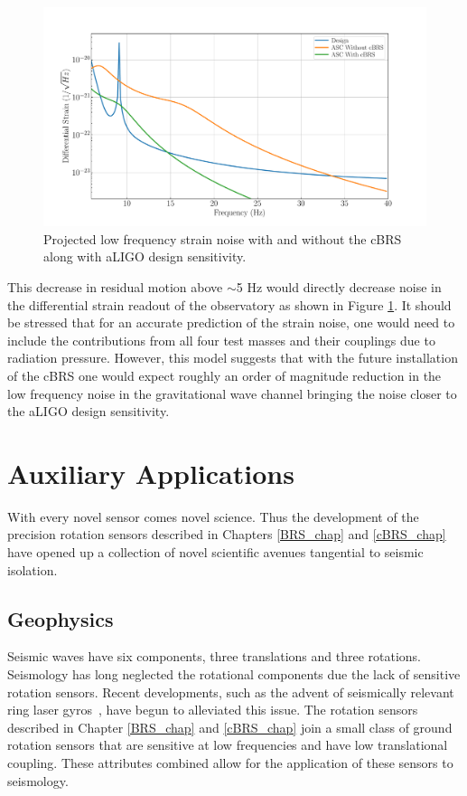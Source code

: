 \documentclass [12pt, proquest]{uwthesis}[2019]
\begin{document}
\begin{figure}[!h]
\begin{center}
\includegraphics[width=\textwidth]{cBRS_ASC.pdf}
\caption[Projected low frequency strain noise with and without the cBRS]{Projected low frequency strain noise with and without the cBRS along with aLIGO design sensitivity. \cite{aLIGO} }
\label{ascStrain}
\end{center}
\end{figure}

This decrease in residual motion above $\sim$5 Hz would directly decrease noise in the differential strain readout of the observatory as shown in Figure \ref{ascStrain}. It should be stressed that for an accurate prediction of the strain noise, one would need to include the contributions from all four test masses and their couplings due to radiation pressure. However, this model suggests that with the future installation of the cBRS one would expect roughly an order of magnitude reduction in the low frequency noise in the gravitational wave channel bringing the noise closer to the aLIGO design sensitivity.


\chapter{Auxiliary Applications}
\quad With every novel sensor comes novel science. Thus the development of the precision rotation sensors described in Chapters \ref{BRS_chap} and \ref{cBRS_chap} have opened up a collection of novel scientific avenues tangential to seismic isolation.

\section{Geophysics}
Seismic waves have six components, three translations and three rotations. Seismology has long neglected the rotational components due the lack of sensitive rotation sensors. Recent developments, such as the advent of seismically relevant ring laser gyros~\cite{ring}, have begun to alleviated this issue. The rotation sensors described in Chapter \ref{BRS_chap} and \ref{cBRS_chap} join a small class of ground rotation sensors that are sensitive at low frequencies and have low translational coupling. These attributes combined allow for the application of these sensors to seismology.
\end{document}
